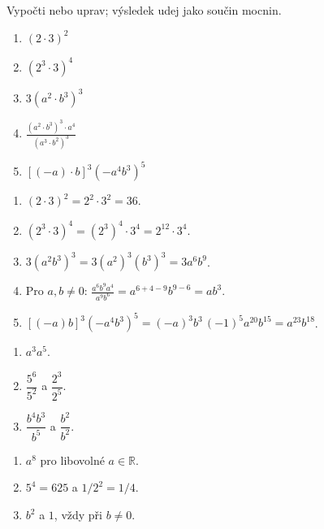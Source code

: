 \documentclass[11pt,a4paper]{article}
\begin{document}
\begin{prikladReseniBox}[title={Příklad 4},breakable=false]
Vypočti nebo uprav; výsledek udej jako součin mocnin.
\begin{enumerate}[label=\alph*)]
\item $(2\cdot3)^2$
\item $(2^3\cdot3)^4$
\item $3(a^2\cdot b^3)^3$
\item $\displaystyle\frac{(a^2\cdot b^3)^3\cdot a^4}{(a^3\cdot b^2)^3}$
\item $[(-a)\cdot b]^3(-a^4b^3)^5$
\end{enumerate}
\tcblower
\begin{enumerate}[label=\alph*),itemsep=2pt]
\item $(2\cdot3)^2=\boxed{2^2\cdot3^2}=36$.
\item $(2^3\cdot3)^4=(2^3)^4\cdot3^4
=\boxed{2^{12}\cdot3^4}$.
\item $3(a^2b^3)^3=3(a^2)^3(b^3)^3=\boxed{3a^6b^9}$.
\item Pro $a,b\ne0$:
$\displaystyle\frac{a^6b^9a^4}{a^9b^6}
=a^{6+4-9}b^{9-6}=\boxed{ab^3}$.
\item $[(-a)b]^3(-a^4b^3)^5
=(-a)^3b^3\,(-1)^5a^{20}b^{15}
=\boxed{a^{23}b^{18}}$.
\end{enumerate}
\end{prikladReseniBox}

\begin{zadaniReseniBox}[title={Samostatná práce 2},breakable=false]
\begin{enumerate}[label=\alph*)]
\item $a^3a^5$.
\item $\dfrac{5^6}{5^2}$ a $\dfrac{2^3}{2^5}$.
\item $\dfrac{b^4b^3}{b^5}$ a $\dfrac{b^2}{b^2}$.
\end{enumerate}
\tcblower
\begin{enumerate}[label=\alph*)]
\item $a^8$ pro libovolné $a\in\mathbb R$.
\item $5^4=625$ a $1/2^2=1/4$.
\item $b^2$ a $1$, vždy při $b\ne0$.
\end{enumerate}
\end{zadaniReseniBox}
\end{document}
